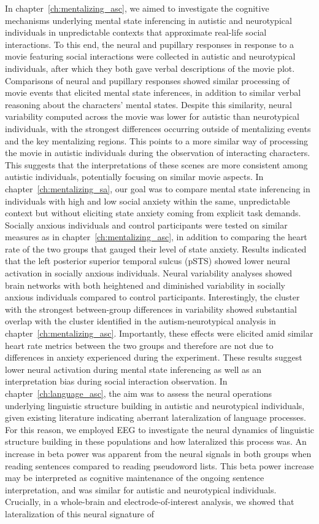 In chapter~\ref{ch:mentalizing_asc}, we aimed to investigate the cognitive mechanisms underlying mental state inferencing in autistic and neurotypical individuals in unpredictable contexts that approximate real-life social interactions. To this end, the neural and pupillary responses in response to a movie featuring social interactions were collected in autistic and neurotypical individuals, after which they both gave verbal descriptions of the movie plot. Comparisons of neural and pupillary responses showed similar processing of movie events that elicited mental state inferences, in addition to similar verbal reasoning about the characters' mental states. Despite this similarity, neural variability computed across the movie was lower for autistic than neurotypical individuals, with the strongest differences occurring outside of mentalizing events and the key mentalizing regions. This points to a more similar way of processing the movie in autistic individuals during the observation of interacting characters. This suggests that the interpretations of these scenes are more consistent among autistic individuals, potentially focusing on similar movie aspects. In chapter~\ref{ch:mentalizing_sa}, our goal was to compare mental state inferencing in individuals with high and low social anxiety within the same, unpredictable context but without eliciting state anxiety coming from explicit task demands. Socially anxious individuals and control participants were tested on similar measures as in chapter~\ref{ch:mentalizing_asc}, in addition to comparing the heart rate of the two groups that gauged their level of state anxiety. Results indicated that the left posterior superior temporal sulcus (pSTS) showed lower neural activation in socially anxious individuals. Neural variability analyses showed brain networks with both heightened and diminished variability in socially anxious individuals compared to control participants. Interestingly, the cluster with the strongest between-group differences in variability showed substantial overlap with the cluster identified in the autism-neurotypical analysis in chapter~\ref{ch:mentalizing_asc}. Importantly, these effects were elicited amid similar heart rate metrics between the two groups and therefore are not due to differences in anxiety experienced during the experiment. These results suggest lower neural activation during mental state inferencing as well as an interpretation bias during social interaction observation. In chapter~\ref{ch:language_asc}, the aim was to assess the neural operations underlying linguistic structure building in autistic and neurotypical individuals, given existing literature indicating aberrant lateralization of language processes. For this reason, we employed EEG to investigate the neural dynamics of linguistic structure building in these populations and how lateralized this process was. An increase in beta power was apparent from the neural signals in both groups when reading sentences compared to reading pseudoword lists. This beta power increase may be interpreted as cognitive maintenance of the ongoing sentence interpretation, and was similar for autistic and neurotypical individuals. Crucially, in a whole-brain and electrode-of-interest analysis, we showed that lateralization of this neural signature of 